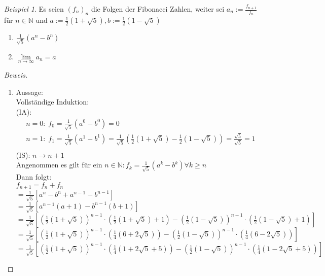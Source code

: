 \documentclass[12pt,a4paper,titlepage]{article} %
\theoremstyle{definition}
\theoremstyle{remark}
\newtheorem*{bsp}{Beispiel}
\newenvironment{bew}{\begin{proof}[Beweis]}{\end{proof}}
\newcommand{\N}{\mathbb{N}}
\newcommand{\limes}[1]{\lim\limits_{#1\rightarrow\infty}}
\begin{document}
	\begin{bsp}
		Es seien \((f_n)_n\) die Folgen der Fibonacci Zahlen, weiter sei \(a_n := \frac{f_{n+1}}{f_n}\) für \(n \in \N\) und \(a := \frac{1}{2}(1 + \sqrt{5}), b := \frac{1}{2}(1 - \sqrt{5})\)\\
		\begin{enumerate}
			\item \(\frac{1}{\sqrt{5}}\left(a^n-b^n\right)\)
			\item \(\limes{n} a_n = a\)
		\end{enumerate}
		\begin{bew}
			\begin{enumerate}
				\item Aussage:\\
					Vollständige Induktion:\\
					(IA):
					\begin{align*}
						&n = 0: \; f_0 = \frac{1}{\sqrt{5}} \left(a^0-b^0 \right) = 0\\		
						&n = 1: \; f_1 = \frac{1}{\sqrt{5}} \left(a^1-b^1 \right) = \frac{1}{\sqrt{5}} \left(\frac{1}{2}(1 + \sqrt{5})-\frac{1}{2}(1 - \sqrt{5}) \right) = \frac{\sqrt{5}}{\sqrt{5}} = 1\\		
					\end{align*}
					(IS): \(n \rightarrow n+1\)\\
					Angenommen es gilt für ein \(n \in \N: f_k = \frac{1}{\sqrt{5}}\left(a^k-b^k\right) \forall k \geq n\)\\
					Dann folgt:\\
					\(f_{n+1} = f_n + f_n\)\\
					\(= \frac{1}{\sqrt{5}}\left[a^n - b^n +a^{n-1} - b^{n-1}\right]\)\\
					\(= \frac{1}{\sqrt{5}}\left[a^{n-1}(a+1) - b^{n-1}(b+1)\right]\)\\
					\(= \frac{1}{\sqrt{5}}\left[\left(\frac{1}{2}\left(1 + \sqrt{5}\right)\right)^{n-1} \cdot\left(\frac{1}{2}\left(1 + \sqrt{5}\right)+1\right) - \left(\frac{1}{2}\left(1 - \sqrt{5}\right)\right)^{n-1}\cdot\left(\frac{1}{2}\left(1 - \sqrt{5}\right)+1\right)\right]\)\\
					\(= \frac{1}{\sqrt{5}}\left[\left(\frac{1}{2}\left(1 + \sqrt{5}\right)\right)^{n-1}\cdot\left(\frac{1}{4}\left(6 + 2\sqrt{5}\right)\right) - \left(\frac{1}{2}\left(1 - \sqrt{5}\right)\right)^{n-1}\cdot\left(\frac{1}{4}\left(6 - 2\sqrt{5}\right)\right)\right]\)\\
					\(= \frac{1}{\sqrt{5}}\left[\left(\frac{1}{2}\left(1 + \sqrt{5}\right)\right)^{n-1}\cdot\left(\frac{1}{4}\left(1 + 2\sqrt{5} + 5\right)\right) - \left(\frac{1}{2}\left(1 - \sqrt{5}\right)\right)^{n-1}\cdot\left(\frac{1}{4}\left(1 - 2\sqrt{5} + 5\right)\right)\right]\)\\

\end{enumerate}
\end{bew}
\end{bsp}
\end{document}
